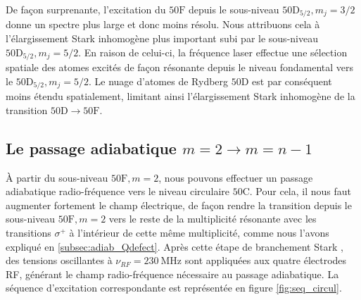 De façon surprenante, l'excitation du $\mathrm{50F}$ depuis le sous-niveau $\mathrm{50D}_{5/2}, m_j = 3/2$ donne un spectre plus large et donc moins résolu.
Nous attribuons cela à l'élargissement Stark inhomogène plus important subi par le sous-niveau $\mathrm{50D}_{5/2}, m_j = 5/2$.
En raison de celui-ci, la fréquence laser effectue une sélection spatiale des atomes excités de façon résonante depuis le niveau fondamental vers le $\mathrm{50D}_{5/2}, m_j = 5/2$.
Le nuage d'atomes de Rydberg $\mathrm{50D}$ est par conséquent moins étendu spatialement, limitant ainsi l'élargissement Stark inhomogène de la transition $\mathrm{50D}\rightarrow\mathrm{50F}$.

	\subsection{Le passage adiabatique $m=2\rightarrow m=n-1$}
\noindent \`A partir du sous-niveau $\mathrm{50F},m=2$, nous pouvons effectuer un passage adiabatique radio-fréquence vers le niveau circulaire $\mathrm{50C}$.
Pour cela, il nous faut augmenter fortement le champ électrique, de façon rendre la transition depuis le sous-niveau $\mathrm{50F},m=2$ vers le reste de la multiplicité résonante avec les transitions $\sigma^+$ à l'intérieur de cette même multiplicité, comme nous l'avons expliqué en \ref{subsec:adiab_Qdefect}.
Après cette étape de \og branchement Stark \fg{}, des tensions oscillantes à $\nu_{RF} = \SI{230}{\MHz}$ sont appliquées aux quatre électrodes RF, générant le champ radio-fréquence nécessaire au passage adiabatique.
La séquence d'excitation correspondante est représentée en figure \eqref{fig:seq_circul}.

